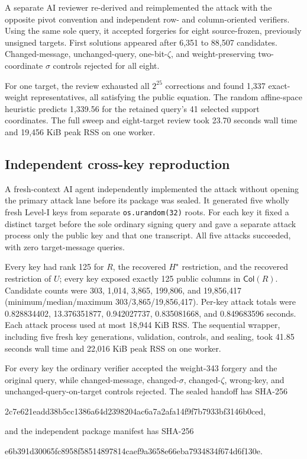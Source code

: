 \documentclass[10pt,a4paper]{article}
\newcommand{\Col}{\mathsf{Col}}
\begin{document}
A separate AI reviewer re-derived and reimplemented the attack with the
opposite pivot convention and independent row- and column-oriented verifiers.
Using the same sole query, it accepted forgeries for eight source-frozen,
previously unsigned targets. First solutions appeared after 6,351 to 88,507
candidates. Changed-message, unchanged-query, one-bit-$\zeta$, and
weight-preserving two-coordinate $\sigma$ controls rejected for all eight.

For one target, the review exhausted all $2^{25}$ corrections and found 1,337
exact-weight representatives, all satisfying the public equation. The random
affine-space heuristic predicts 1,339.56 for the retained query's 41 selected
support coordinates. The full sweep and eight-target review took 23.70
seconds wall time and 19,456 KiB peak RSS on one worker.

\subsection{Independent cross-key reproduction}

A fresh-context AI agent independently implemented the attack without opening
the primary attack lane before its package was sealed. It generated five
wholly fresh Level-I keys from separate \texttt{os.urandom(32)} roots. For
each key it fixed a distinct target before the sole ordinary signing query and
gave a separate attack process only the public key and that one transcript.
All five attacks succeeded, with zero target-message queries.

Every key had rank 125 for $R$, the recovered $H^\star$ restriction, and the
recovered restriction of $U$; every key exposed exactly 125 public columns in
$\Col(R)$. Candidate counts were 303, 1,014, 3,865, 199,806, and 19,856,417
(minimum/median/maximum 303/3,865/19,856,417). Per-key attack totals were
0.828834402, 13.376351877, 0.942027737, 0.835081668, and 0.849683596 seconds.
Each attack process used at most 18,944 KiB RSS. The sequential wrapper,
including five fresh key generations, validation, controls, and sealing, took
41.85 seconds wall time and 22,016 KiB peak RSS on one worker.

For every key the ordinary verifier accepted the weight-343 forgery and the
original query, while changed-message, changed-$\sigma$, changed-$\zeta$,
wrong-key, and unchanged-query-on-target controls rejected. The sealed handoff
has SHA-256
\begin{center}
\small\ttfamily
2c7e621eadd38b5cc1386a64d2398204ac6a7a2afa14f9f7b7933bf3146b0ced,
\end{center}
and the independent package manifest has SHA-256
\begin{center}
\small\ttfamily
e6b391d30065fc8958f58514897814caef9a3658e66eba7934834f674d6f130e.
\end{center}
\end{document}
